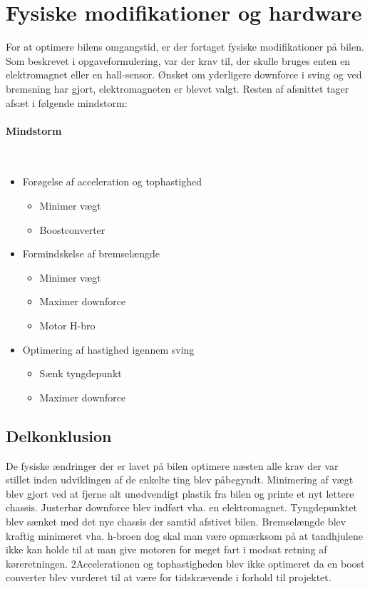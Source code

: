 
\section{Fysiske modifikationer og hardware}

For at optimere bilens omgangstid, er der fortaget fysiske modifikationer på bilen.
Som beskrevet i opgaveformulering, var der krav til, der skulle bruges enten en elektromagnet eller en hall-sensor.
Ønsket om yderligere downforce i sving og ved bremsning har gjort, elektromagneten er blevet valgt.
Resten af afsnittet tager afsæt i følgende mindstorm:
\paragraph{Mindstorm} \\
\begin{itemize}
\item Forøgelse af acceleration og tophastighed
	\begin{itemize}
		\item Minimer vægt
		\item Boostconverter
	\end{itemize}
\item Formindskelse af bremselængde
	\begin{itemize}
		\item Minimer vægt
		\item Maximer downforce
		\item Motor H-bro
	\end{itemize}
\item Optimering af hastighed igennem sving
	\begin{itemize}
		\item Sænk tyngdepunkt
		\item Maximer downforce
	\end{itemize}
\end{itemize}








\subsection{Delkonklusion}
De fysiske ændringer der er lavet på bilen optimere næsten alle krav der var stillet inden udviklingen af de enkelte ting blev påbegyndt.
Minimering af vægt blev gjort ved at fjerne alt unødvendigt plastik fra bilen og printe et nyt lettere chassis.
Justerbar downforce blev indført vha. en elektromagnet. Tyngdepunktet blev sænket med det nye chassis der samtid afstivet bilen.
Bremselængde blev kraftig minimeret vha. h-broen dog skal man være opmærksom på at tandhjulene ikke kan holde til at man give motoren for meget fart i modsat retning af køreretningen.
2Accelerationen og tophastigheden blev ikke optimeret da en boost converter blev vurderet til at være for tidskrævende i forhold til projektet.
